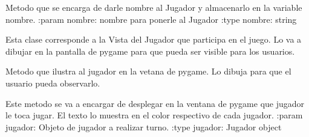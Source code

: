 \documentclass[letterpaper,10pt,english]{sphinxmanual}
\begin{document}
\begin{fulllineitems}
\begin{fulllineitems}
\end{fulllineitems}


\begin{fulllineitems}
\label{\detokenize{codigo:jugador.Jugador.setNombre}}
Metodo que se encarga de darle nombre al Jugador y almacenarlo en la variable nombre.
:param nombre: nombre para ponerle al Jugador
:type nombre: string

\end{fulllineitems}


\end{fulllineitems}


\begin{fulllineitems}
\label{\detokenize{codigo:jugador.VistaJugador}}
Esta clase corresponde a la Vista del Jugador que participa en el juego. Lo va a dibujar en la pantalla de pygame
para que pueda ser visible para los usuarios.

\begin{fulllineitems}
\label{\detokenize{codigo:jugador.VistaJugador.dibujar}}
Metodo que ilustra al jugador en la vetana de pygame. Lo dibuja para que el usuario
pueda observarlo.

\end{fulllineitems}


\begin{fulllineitems}
\label{\detokenize{codigo:jugador.VistaJugador.muestre_turno_jugador}}
Este metodo se va a encargar de desplegar en la ventana de pygame que jugador
le toca jugar. El texto lo muestra en el color respectivo de cada jugador. 
:param jugador: Objeto de jugador a realizar turno.
:type jugador: Jugador object

\end{fulllineitems}


\end{fulllineitems}
\end{document}
